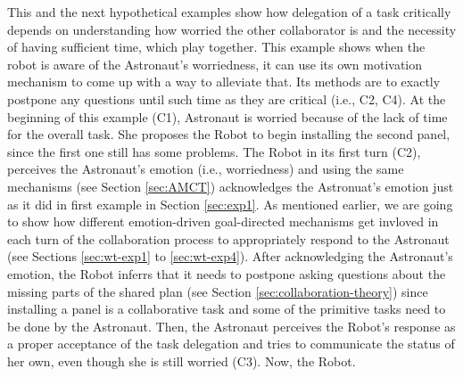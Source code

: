 This and the next hypothetical examples show how delegation of a task critically
depends on understanding how worried the other collaborator is and the necessity
of having sufficient time, which play together. This example shows when the
robot is aware of the Astronaut's worriedness, it can use its own motivation
mechanism to come up with a way to alleviate that. Its methods are to exactly
postpone any questions until such time as they are critical (i.e., C2, C4).
At the beginning of this example (C1), Astronaut is worried because of the lack
of time for the overall task. She proposes the Robot to begin installing the
second panel, since the first one still has some problems. The Robot in its
first turn (C2), perceives the Astronaut's emotion (i.e., worriedness) and
using the same mechanisms (see Section \ref{sec:AMCT}) acknowledges the
Astronuat's emotion just as it did in first example in Section \ref{sec:exp1}.
As mentioned earlier, we are going to show how different emotion-driven
goal-directed mechanisms get invloved in each turn of the collaboration process
to appropriately respond to the Astronaut (see Sections \ref{sec:wt-exp1} to
\ref{sec:wt-exp4}). After acknowledging the Astronaut's emotion, the Robot
inferrs that it needs to postpone asking questions about the missing parts of
the shared plan (see Section \ref{sec:collaboration-theory}) since installing
a panel is a collaborative task and some of the primitive tasks need to be done
by the Astronaut. Then, the Astronaut perceives the Robot's response as a
proper acceptance of the task delegation and tries to communicate the status
of her own, even though she is still worried (C3). Now, the Robot. \\

